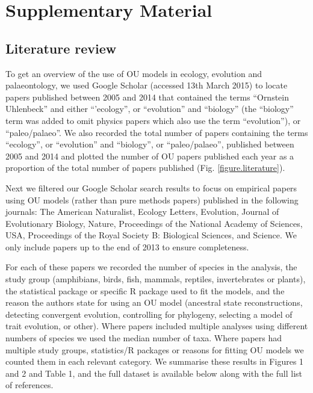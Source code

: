\section{Supplementary Material}
\setcounter{table}{0} \renewcommand{\thetable}{S\arabic{table}}

  \subsection{Literature review}
    To get an overview of the use of OU models in ecology, evolution and palaeontology, we used Google Scholar (accessed 13th March 2015) to locate papers published between 2005 \citep[when the R package ouch was released;][]{Butler:2004aa} and 2014 that contained the terms ``Ornstein Uhlenbeck'' and either ``'ecology'', or ``evolution'' and ``biology'' (the ``biology'' term was added to omit physics papers which also use the term ``evolution''), or ``paleo/palaeo''. 
    We also recorded the total number of papers containing the terms ``ecology'', or ``evolution'' and ``biology'', or ``paleo/palaeo'', published between 2005 and 2014 and plotted the number of OU papers published each year as a proportion of the total number of papers published (Fig. \ref{figure.literature}). 

    Next we filtered our Google Scholar search results to focus on empirical papers using OU models (rather than pure methods papers) published in the following journals: The American Naturalist, Ecology Letters, Evolution, Journal of Evolutionary Biology, Nature, Proceedings of the National Academy of Sciences, USA, Proceedings of the Royal Society B: Biological Sciences, and Science.
    We only include papers up to the end of 2013 to ensure completeness.

    For each of these papers we recorded the number of species in the analysis, the study group (amphibians, birds, fish, mammals, reptiles, invertebrates or plants), the statistical package or specific R package used to fit the models, and the reason the authors state for using an OU model (ancestral state reconstructions, detecting convergent evolution, controlling for phylogeny, selecting a model of trait evolution, or other). 
    Where papers included multiple analyses using different numbers of species we used the median number of taxa. 
    Where papers had multiple study groups, statistics/R packages or reasons for fitting OU models we counted them in each relevant category. 
    We summarise these results in Figures 1 and 2 and Table 1, and the full dataset is available below along with the full list of references.

